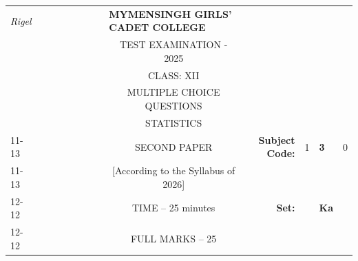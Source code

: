 \documentclass[12pt]{exam}
\begin{document}
\begin{table}[]
\begin{tabular}{llllllllcllll}
\textit{Rigel} &  &  &  &  &  &  &  & \multicolumn{1}{l}{\textbf{MYMENSINGH GIRLS' CADET COLLEGE}} &                                             &                        &                                 &                        \\
                &  &  &  &  &  &  &  & \multicolumn{1}{c}{TEST EXAMINATION - 2025}       &                                             &                        & \multicolumn{1}{c}{}            &                        \\
                &  &  &  &  &  &  &  & CLASS: XII                                                   &                                             &                        & \multicolumn{1}{c}{}            &                        \\
                &  &  &  &  &  &  &  & MULTIPLE CHOICE QUESTIONS                                    &                                             &                        & \multicolumn{1}{c}{}            &                        \\
                &  &  &  &  &  &  &  & STATISTICS                                                   &                                             &                        & \multicolumn{1}{r}{}            &                        \\ \cline{11-13} 
                &  &  &  &  &  &  &  & SECOND PAPER                                                 & \multicolumn{1}{r|}{\textbf{Subject Code:}} & \multicolumn{1}{l|}{1} & \multicolumn{1}{l|}{\textbf{3}} & \multicolumn{1}{l|}{0} \\ \cline{11-13} 
                &  &  &  &  &  &  &  & [According to the Syllabus of 2026]                          & \multicolumn{1}{r}{}                        &                        &                                 &                        \\ \cline{12-12}
                &  &  &  &  &  &  &  & TIME – 25 minutes                                            & \multicolumn{1}{r}{\textbf{Set:}}           & \multicolumn{1}{l|}{}  & \multicolumn{1}{l|}{\textbf{Ka}} &                        \\ \cline{12-12}
                &  &  &  &  &  &  &  & FULL MARKS – 25                                              &                                             &                        &                                 &                       
\end{tabular}
\end{table}
\end{document}
